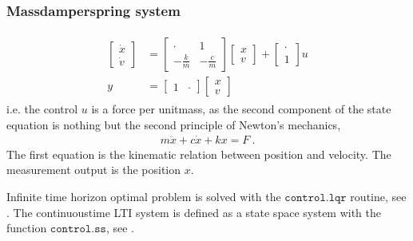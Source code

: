 \documentclass[letterpaper,10pt,english]{jupyterBook}
\begin{document}
\subsubsection{Mass\sphinxhyphen{}damper\sphinxhyphen{}spring system}
\label{\detokenize{ch/control/optimal-control-ref-tracking-example:mass-damper-spring-system}}\begin{equation*}
\begin{split}\begin{aligned}
 \begin{bmatrix} \dot{x} \\ \dot{v} \end{bmatrix} & = \begin{bmatrix} \cdot & 1 \\ - \frac{k}{m} & - \frac{c}{m} \end {bmatrix} \begin{bmatrix} x \\ v \end{bmatrix} + \begin{bmatrix} \cdot \\ 1 \end{bmatrix} u \\
 y & = \begin{bmatrix} 1 & \cdot \end{bmatrix} \begin{bmatrix} x \\ v \end{bmatrix}
\end{aligned}\end{split}
\end{equation*}
\sphinxAtStartPar
i.e. the control \(u\) is a force per unit\sphinxhyphen{}mass, as the second component of the state equation is nothing but the second principle of Newton’s mechanics,
\begin{equation*}
\begin{split}m \ddot{x} + c \dot{x} + k x = F  \ .\end{split}
\end{equation*}
\sphinxAtStartPar
The first equation is the kinematic relation between position and velocity. The measurement output is the position \(x\).

\sphinxAtStartPar
Infinite time horizon optimal problem is solved with the \(\texttt{control.lqr}\) routine, see . The continuous\sphinxhyphen{}time LTI system is defined as a state space system with the function \(\texttt{control.ss}\), see .
\end{document}

